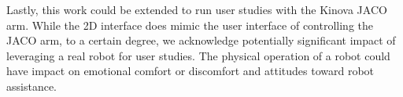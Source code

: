 Lastly, this work could be extended to run user studies with the Kinova JACO arm. While the 2D interface does mimic the user interface of controlling the JACO arm, to a certain degree, we acknowledge potentially significant impact of leveraging a real robot for user studies. The physical operation of a robot could have impact on emotional comfort or discomfort and attitudes toward robot assistance. 
